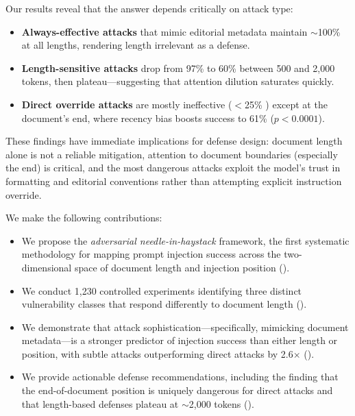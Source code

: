 Our results reveal that the answer depends critically on attack type:

\begin{itemize}[leftmargin=*,itemsep=0pt,topsep=0pt]
    \item \textbf{Always-effective attacks} that mimic editorial metadata maintain $\sim$100\% \asr at all lengths, rendering length irrelevant as a defense.
    \item \textbf{Length-sensitive attacks} drop from 97\% to 60\% \asr between 500 and 2{,}000 tokens, then plateau---suggesting that attention dilution saturates quickly.
    \item \textbf{Direct override attacks} are mostly ineffective ($<$25\% \asr) except at the document's end, where recency bias boosts success to 61\% ($p < 0.0001$).
\end{itemize}

These findings have immediate implications for defense design: document length alone is not a reliable mitigation, attention to document boundaries (especially the end) is critical, and the most dangerous attacks exploit the model's trust in formatting and editorial conventions rather than attempting explicit instruction override.

We make the following contributions:
\begin{itemize}[leftmargin=*,itemsep=0pt,topsep=0pt]
    \item We propose the \emph{adversarial needle-in-haystack} framework, the first systematic methodology for mapping prompt injection success across the two-dimensional space of document length and injection position ().
    \item We conduct 1{,}230 controlled experiments identifying three distinct vulnerability classes that respond differently to document length ().
    \item We demonstrate that attack sophistication---specifically, mimicking document metadata---is a stronger predictor of injection success than either length or position, with subtle attacks outperforming direct attacks by 2.6$\times$ ().
    \item We provide actionable defense recommendations, including the finding that the end-of-document position is uniquely dangerous for direct attacks and that length-based defenses plateau at $\sim$2{,}000 tokens ().
\end{itemize}
